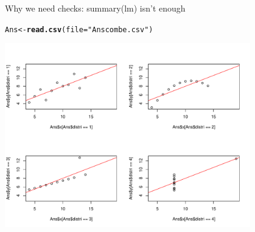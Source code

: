 \documentclass[10pt]{beamer}\usepackage[]{graphicx}\usepackage[]{color}
\makeatletter
\newcommand{\hlstr}[1]{\textcolor[rgb]{0.192,0.494,0.8}{#1}}%
\newcommand{\hlstd}[1]{\textcolor[rgb]{0.345,0.345,0.345}{#1}}%
\newcommand{\hlkwb}[1]{\textcolor[rgb]{0.69,0.353,0.396}{#1}}%
\newcommand{\hlkwc}[1]{\textcolor[rgb]{0.333,0.667,0.333}{#1}}%
\newcommand{\hlkwd}[1]{\textcolor[rgb]{0.737,0.353,0.396}{\textbf{#1}}}%
\newenvironment{kframe}{%
 \def\at@end@of@kframe{}%
 \ifinner\ifhmode%
  \def\at@end@of@kframe{\end{minipage}}%
  \begin{minipage}{\columnwidth}%
 \fi\fi%
 \def\FrameCommand##1{\hskip\@totalleftmargin \hskip-\fboxsep
 \colorbox{shadecolor}{##1}\hskip-\fboxsep
     \hskip-\linewidth \hskip-\@totalleftmargin \hskip\columnwidth}%
 \MakeFramed {\advance\hsize-\width
   \@totalleftmargin\z@ \linewidth\hsize
   \@setminipage}}%
 {\par\unskip\endMakeFramed%
 \at@end@of@kframe}
\newenvironment{knitrout}{}{} %
\makeatother
\begin{document}
\begin{frame}[fragile]{Why we need checks: summary(lm) isn't enough}

\begin{knitrout}
\color{fgcolor}\begin{kframe}
\begin{alltt}
  \hlstd{Ans} \hlkwb{<-} \hlkwd{read.csv}\hlstd{(}\hlkwc{file} \hlstd{=} \hlstr{"Anscombe.csv"}\hlstd{)}
\end{alltt}
\end{kframe}
\end{knitrout}
  
\begin{knitrout}
\color{fgcolor}
\includegraphics[width=0.8\textwidth,height=0.6\textwidth]{figure/anscombe-1} 

\end{knitrout}
\end{frame}
\end{document}
